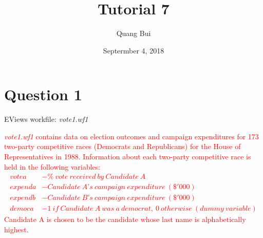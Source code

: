 \documentclass[12pt]{report}
\title{Tutorial 7}
\subtitle
{
	\textbf{keywords}: level log interpretation, dummy variables, hypothesis test, F-test, t-test, p-value, overall significance, individual significance, multiple linear restrictions, reparameterisation
	
	\textbf{estimated reading time}: 35 minutes
}
\author{Quang Bui}
\date{Septermber 4, 2018}
\begin{document}
	
\maketitle

\section*{Question 1}
\noindent EViews workfile: \textit{vote1.wf1}

\noindent \textcolor{red}{\textit{vote1.wf1} contains data on election outcomes and campaign expenditures for 173 two-party competitive races (Democrats and Republicans) for the House of Representatives in 1988. Information about each two-party competitive race is held in the following variables:
\begin{align*}
	votea &- \%\ vote\ received\ by\ Candidate\ A \\
	expenda &- Candidate\ A’s\ campaign\ expenditure\ (\$'000) \\
	expendb &- Candidate\ B’s\ campaign\ expenditure\ (\$'000) \\
	democa &- 1\ if\ Candidate\ A\ was\ a\ democrat,\ 0\ otherwise\ (dummy\ variable)
\end{align*}
\noindent Candidate A is chosen to be the candidate whose last name is alphabetically highest.}
\end{document}
